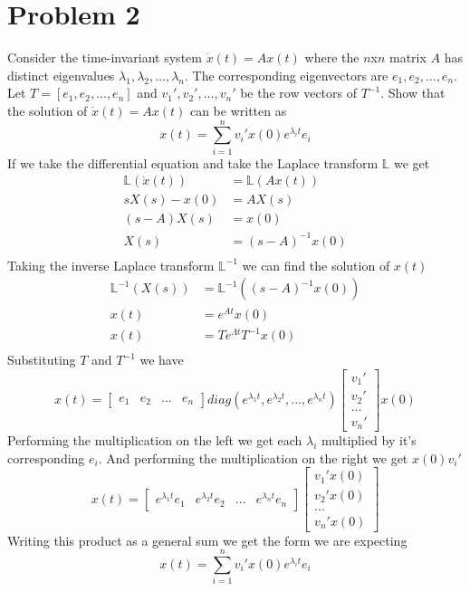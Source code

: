 \documentclass{article}
\begin{document}
\section*{Problem 2}
Consider the time-invariant system $\dot{x}(t) = Ax(t)$ where the $n$x$n$ matrix $A$ has distinct eigenvalues $\lambda_1, \lambda_2, ..., \lambda_n$.
The corresponding eigenvectors are $e_1, e_2, ...,e_n$.
Let $T = [e_1,e_2,...,e_n]$ and $v_1', v_2',...,v_n'$ be the row vectors of $T^{-1}$.
Show that the solution of $\dot{x}(t)=Ax(t)$ can be written as
$$ x(t) = \sum_{i=1}^n v_i' x(0) e^{\lambda_i t} e_i $$
\newline
\newline
If we take the differential equation and take the Laplace transform $\mathbb{L}$ we get
$$
\begin{aligned}
\mathbb{L}(\dot{x}(t)) &= \mathbb{L}(Ax(t)) \\
sX(s) - x(0) &= AX(s) \\
(s-A)X(s) &= x(0) \\
X(s) &= (s-A)^{-1}x(0) \\
\end{aligned}
$$
Taking the inverse Laplace transform $\mathbb{L}^{-1}$ we can find the solution of $x(t)$
$$
\begin{aligned}
\mathbb{L}^{-1}(X(s)) &= \mathbb{L}^{-1}((s-A)^{-1}x(0)) \\
x(t) &= e^{At}x(0) \\
x(t) &= Te^{\Lambda t}T^{-1}x(0) \\
\end{aligned}
$$
Substituting $T$ and $T^{-1}$ we have
$$ x(t) =
\begin{bmatrix} e_1& e_2& ... & e_n\end{bmatrix}
diag(e^{\lambda_1 t},e^{\lambda_2 t}, ..., e^{\lambda_n t})
\begin{bmatrix} v_1' \\ v_2' \\ ... \\ v_n'\end{bmatrix}
x(0)
$$
Performing the multiplication on the left we get each $\lambda_i$ multiplied by it's corresponding $e_i$.
And performing the multiplication on the right we get $x(0)v_i'$
$$ x(t) =
\begin{bmatrix} e^{\lambda_1 t}e_1 & e^{\lambda_2 t}e_2 & ... & e^{\lambda_n t}e_n\end{bmatrix}
\begin{bmatrix} v_1'x(0) \\ v_2'x(0) \\ ... \\ v_n'x(0)\end{bmatrix}
$$
Writing this product as a general sum we get the form we are expecting
$$ x(t) = \sum_{i=1}^n v_i' x(0) e^{\lambda_i t} e_i $$
\end{document}
